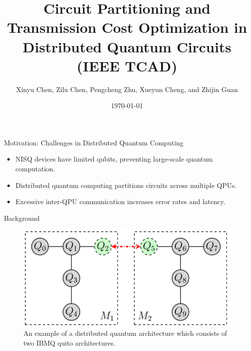 \documentclass{beamer}
\title{Circuit Partitioning and Transmission Cost Optimization in Distributed Quantum Circuits (IEEE TCAD)}
\author{Xinyu Chen, Zilu Chen, Pengcheng Zhu, Xueyun Cheng, and Zhijin Guan}
\date{\today}
\institute{Nantong University}
\begin{document}
	
	\begin{frame}
		\titlepage
	\end{frame}
	
	\begin{frame}{Motivation: Challenges in Distributed Quantum Computing}
		\begin{itemize}
			\item NISQ devices have limited qubits, preventing large-scale quantum computation.
			\item Distributed quantum computing partitions circuits across multiple QPUs.
			\item Excessive inter-QPU communication increases error rates and latency.
		\end{itemize}
	\end{frame}
	

	\begin{frame}{Background}
		\begin{figure}
			\includegraphics[width=.8\textheight]{figure/back.png}
			\caption[]{An example of a distributed quantum architecture which consists of two IBMQ quito architectures.}
		\end{figure}
	\end{frame}
	
\end{document}
